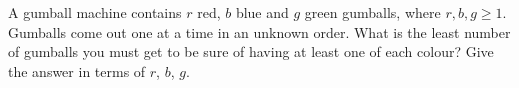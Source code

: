 A gumball machine contains $r$ red, $b$ blue and $g$ green gumballs, where $r,b,g\ge1$. Gumballs come out one at a time in an unknown order. What is the least number of gumballs you must get to be sure of having at least one of each colour? Give the answer in terms of $r$, $b$, $g$.
